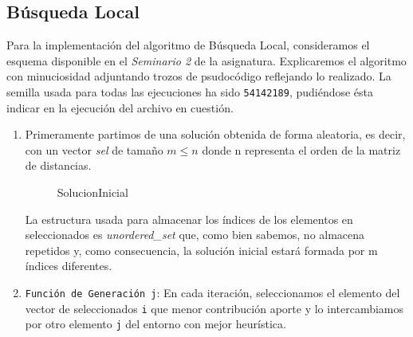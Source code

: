 \newpage

\subsection{Búsqueda Local}
Para la implementación del algoritmo de Búsqueda Local, consideramos el esquema disponible en el \textit{Seminario 2} de la asignatura. Explicaremos el algoritmo con minuciosidad adjuntando trozos de psudocódigo reflejando lo realizado. La semilla usada para todas las ejecuciones ha sido \texttt{54142189}, pudiéndose ésta indicar en la ejecución del archivo en cuestión.

\begin{enumerate}
	\item 
	Primeramente partimos de una solución obtenida de forma aleatoria, es decir, con un vector \textit{sel} de tamaño $m\leq n$ donde n representa el orden de la matriz de distancias. 
	
	
	
	
	
	
	\begin{figure}[H]
		\centering
		\begin{minipage}{.7\linewidth}
			
			
	
	\begin{algorithm}[H] 
		\caption{SolucionInicial}
		\SetAlgoLined
		
		
	
	\end{algorithm}
	
	
			
			
			
		\end{minipage}
	\end{figure}
	
	La estructura usada para almacenar los índices de los elementos en seleccionados es \textit{unordered\_set} que, como bien sabemos, no almacena repetidos y, como consecuencia, la solución inicial estará formada por m índices diferentes.
		
	
	\item 
	\texttt{Función de Generación j}: En cada iteración, seleccionamos el elemento del vector de seleccionados \texttt{i} que menor  contribución aporte y lo intercambiamos por otro elemento \texttt{j} del entorno con mejor heurística.
	

\end{enumerate}

